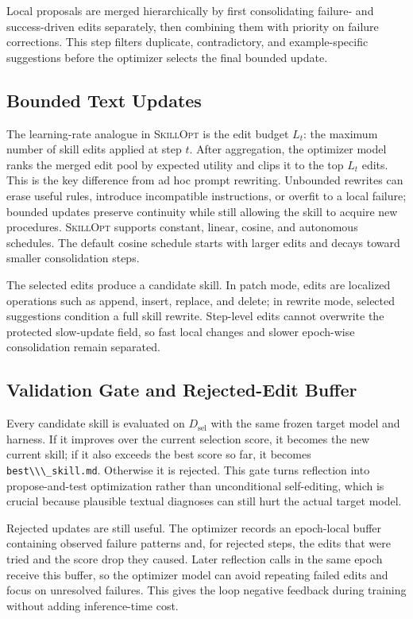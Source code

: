 \documentclass[
]{article}
\newcommand{\passthrough}[1]{#1}
\newcommand{\ourmethod}{\textsc{SkillOpt}\xspace}
\begin{document}
Local proposals are merged hierarchically by first consolidating
failure- and success-driven edits separately, then combining them with
priority on failure corrections. This step filters duplicate,
contradictory, and example-specific suggestions before the optimizer
selects the final bounded update.

\subsection{Bounded Text Updates}\label{sec-method-controls}

The learning-rate analogue in \ourmethod{} is the edit budget \(L_t\):
the maximum number of skill edits applied at step \(t\). After
aggregation, the optimizer model ranks the merged edit pool by expected
utility and clips it to the top \(L_t\) edits. This is the key
difference from ad hoc prompt rewriting. Unbounded rewrites can erase
useful rules, introduce incompatible instructions, or overfit to a local
failure; bounded updates preserve continuity while still allowing the
skill to acquire new procedures. \ourmethod{} supports constant, linear,
cosine, and autonomous schedules. The default cosine schedule starts
with larger edits and decays toward smaller consolidation steps.

The selected edits produce a candidate skill. In patch mode, edits are
localized operations such as append, insert, replace, and delete; in
rewrite mode, selected suggestions condition a full skill rewrite.
Step-level edits cannot overwrite the protected slow-update field, so
fast local changes and slower epoch-wise consolidation remain separated.

\subsection{Validation Gate and Rejected-Edit
Buffer}\label{sec-method-gate}

Every candidate skill is evaluated on \(D_{\mathrm{sel}}\) with the same
frozen target model and harness. If it improves over the current
selection score, it becomes the new current skill; if it also exceeds
the best score so far, it becomes
\passthrough{\lstinline!best\\\_skill.md!}. Otherwise it is rejected.
This gate turns reflection into propose-and-test optimization rather
than unconditional self-editing, which is crucial because plausible
textual diagnoses can still hurt the actual target model.

Rejected updates are still useful. The optimizer records an epoch-local
buffer containing observed failure patterns and, for rejected steps, the
edits that were tried and the score drop they caused. Later reflection
calls in the same epoch receive this buffer, so the optimizer model can
avoid repeating failed edits and focus on unresolved failures. This
gives the loop negative feedback during training without adding
inference-time cost.
\end{document}

